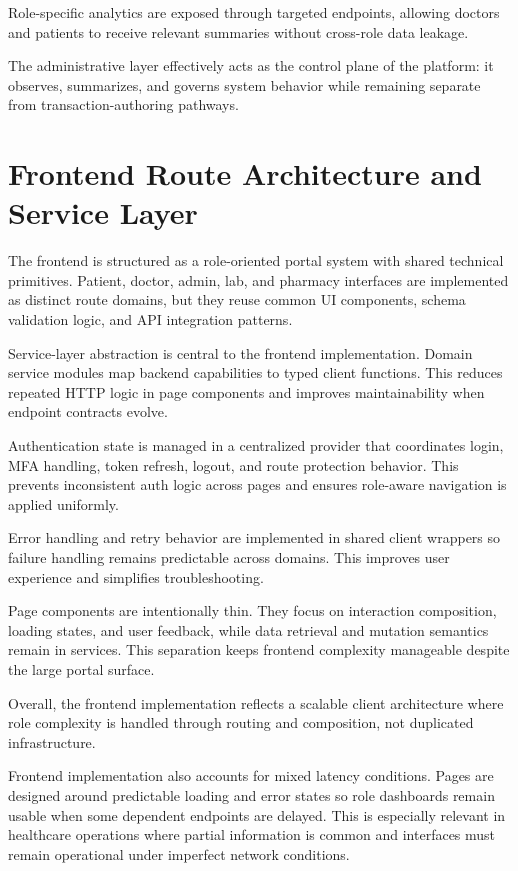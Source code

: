 Role-specific analytics are exposed through targeted endpoints, allowing doctors and patients to receive relevant summaries without cross-role data leakage.

The administrative layer effectively acts as the control plane of the platform: it observes, summarizes, and governs system behavior while remaining separate from transaction-authoring pathways.

\section{Frontend Route Architecture and Service Layer}\label{514-frontend-route-architecture-and-service-layer}

The frontend is structured as a role-oriented portal system with shared technical primitives. Patient, doctor, admin, lab, and pharmacy interfaces are implemented as distinct route domains, but they reuse common UI components, schema validation logic, and API integration patterns.

Service-layer abstraction is central to the frontend implementation. Domain service modules map backend capabilities to typed client functions. This reduces repeated HTTP logic in page components and improves maintainability when endpoint contracts evolve.

Authentication state is managed in a centralized provider that coordinates login, MFA handling, token refresh, logout, and route protection behavior. This prevents inconsistent auth logic across pages and ensures role-aware navigation is applied uniformly.

Error handling and retry behavior are implemented in shared client wrappers so failure handling remains predictable across domains. This improves user experience and simplifies troubleshooting.

Page components are intentionally thin. They focus on interaction composition, loading states, and user feedback, while data retrieval and mutation semantics remain in services. This separation keeps frontend complexity manageable despite the large portal surface.

Overall, the frontend implementation reflects a scalable client architecture where role complexity is handled through routing and composition, not duplicated infrastructure.

Frontend implementation also accounts for mixed latency conditions. Pages are designed around predictable loading and error states so role dashboards remain usable when some dependent endpoints are delayed. This is especially relevant in healthcare operations where partial information is common and interfaces must remain operational under imperfect network conditions.

